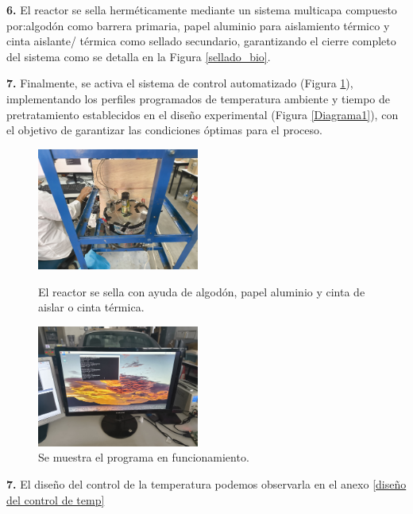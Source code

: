 \documentclass[12pt]{article}
\begin{document}
			
			\textbf{6.} El reactor se sella herméticamente mediante un sistema multicapa compuesto por:algodón como barrera primaria, papel aluminio para aislamiento térmico y cinta aislante/ térmica como sellado secundario, garantizando el cierre completo del sistema como se detalla en la Figura \ref{sellado_bio}.
			
			
			
			\textbf{7.} Finalmente, se activa el sistema de control automatizado (Figura \ref{programa}), implementando los perfiles programados de temperatura ambiente y tiempo de pretratamiento establecidos en el diseño experimental (Figura \ref{Diagrama1}), con el objetivo de garantizar las condiciones óptimas para el proceso.
			
			
			\begin{figure}[H]
			\centering
			\begin{minipage}{0.46\textwidth}
				\centering
				\includegraphics[width=\linewidth, height=4cm, keepaspectratio]{imagenes/sellado2}
				\caption{El reactor se sella con ayuda de algodón, papel aluminio y cinta de aislar o cinta térmica.}
				\label{sellado_bio}
			\end{minipage}
			\hfill
			\begin{minipage}{0.48\textwidth}
					\centering
				\includegraphics[width=\linewidth, height=4cm, keepaspectratio]{imagenes/programa3}
				\caption{Se muestra el programa en funcionamiento.}
				\label{programa}
			\end{minipage}
		\end{figure}
			
		\textbf{7.} El diseño del control de la temperatura podemos observarla en el anexo \ref{diseño del control de temp}
			
\end{document}
